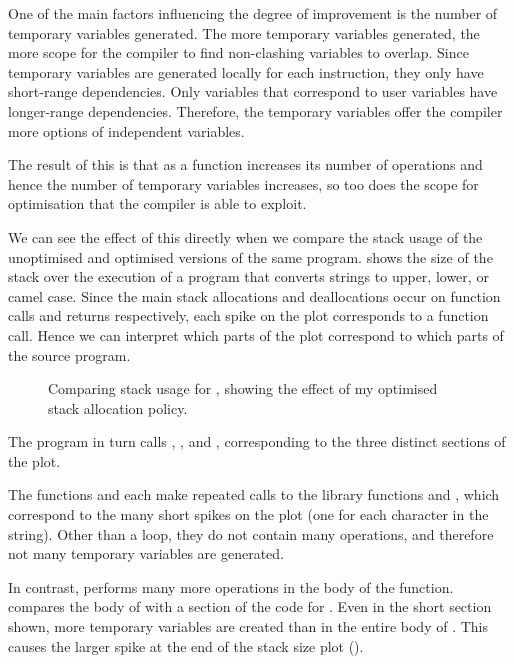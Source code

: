 \documentclass[00-main.tex]{subfiles}
\begin{document}
One of the main factors influencing the degree of improvement is the number of temporary variables generated.
The more temporary variables generated, the more scope for the compiler to find non-clashing variables to overlap.
Since temporary variables are generated locally for each instruction, they only have short-range dependencies.
Only variables that correspond to user variables have longer-range dependencies.
Therefore, the temporary variables offer the compiler more options of independent variables.

The result of this is that as a function increases its number of operations and hence the number of temporary variables increases, so too does the scope for optimisation that the compiler is able to exploit.

We can see the effect of this directly when we compare the stack usage of the unoptimised and optimised versions of the same program.
 shows the size of the stack over the execution of a program that converts strings to upper, lower, or camel case.
Since the main stack allocations and deallocations occur on function calls and returns respectively, each spike on the plot corresponds to a function call.
Hence we can interpret which parts of the plot correspond to which parts of the source program.

\begin{figure}[p]
  \centering
  \caption{Comparing stack usage for , showing the effect of my optimised stack allocation policy.}
  \label{fig:comparing stack usage for case.c} %
\end{figure}

The program in turn calls , , and , corresponding to the three distinct sections of the plot.

The functions  and  each make repeated calls to the library functions  and , which correspond to the many short spikes on the plot (one for each character in the string).
Other than a  loop, they do not contain many operations, and therefore not many temporary variables are generated.

In contrast,  performs many more operations in the body of the function.
 compares the body of  with a section of the code for .
Even in the short section shown, more temporary variables are created than in the entire body of .
This causes the larger spike at the end of the stack size plot ().
\end{document}
